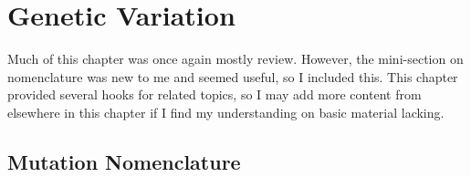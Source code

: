 \documentclass{inVerba-notes}
\begin{document}

\chapter{Genetic Variation}\label{Genetic Variation}
\begin{adjustwidth}{1cm}{1cm}
  Much of this chapter was once again mostly review. However, the mini-section on nomenclature was new to me and seemed useful, so I included this. This chapter provided several hooks for related topics, so I may add more content from elsewhere in this chapter if I find my understanding on basic material lacking.
\end{adjustwidth}

\section{Mutation Nomenclature}\label{Mutation Nomenclature}
\end{document}
